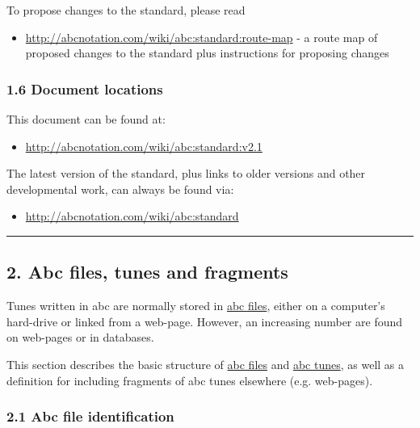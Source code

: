 \documentclass[oneside]{book}
\begin{document}
To propose changes to the standard, please read

\begin{itemize}
\item
  \url{http://abcnotation.com/wiki/abc:standard:route-map} - a route map
  of proposed changes to the standard plus instructions for proposing
  changes
\end{itemize}

\hypertarget{document_locations}{\subsubsection{1.6 Document
locations}\label{document_locations}}

This document can be found at:

\begin{itemize}
\item
  \url{http://abcnotation.com/wiki/abc:standard:v2.1}
\end{itemize}

The latest version of the standard, plus links to older versions and
other developmental work, can always be found via:

\begin{itemize}
\item
  \url{http://abcnotation.com/wiki/abc:standard}
\end{itemize}

\begin{center}\rule{0.5\linewidth}{\linethickness}\end{center}

\hypertarget{abc_files_tunes_and_fragments}{\subsection{2. Abc files,
tunes and fragments}\label{abc_files_tunes_and_fragments}}

Tunes written in abc are normally stored in
\protect\hyperlink{abc_file_definition}{abc files}, either on a
computer's hard-drive or linked from a web-page. However, an increasing
number are found on web-pages or in databases.

This section describes the basic structure of
\protect\hyperlink{abc_file_definition}{abc files} and
\protect\hyperlink{abc_tune_definition}{abc tunes}, as well as a
definition for including fragments of abc tunes elsewhere (e.g.
web-pages).

\hypertarget{abc_file_identification}{\subsubsection{2.1 Abc file
identification}\label{abc_file_identification}}
\end{document}
